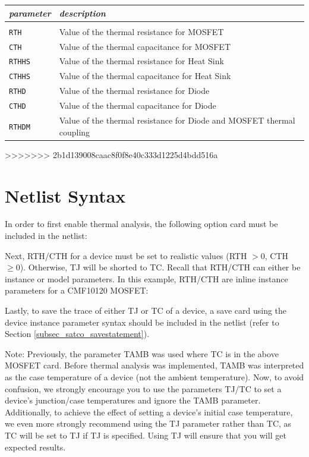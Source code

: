 \begin{tabular}{l l}
\textit{parameter} & \textit{description} \\ \hline \\ \vspace{-0.8\parskip}
\texttt{RTH} & Value of the thermal resistance for MOSFET \\
\texttt{CTH} & Value of the thermal capacitance for MOSFET \\
\texttt{RTHHS} & Value of the thermal resistance for Heat Sink \\
\texttt{CTHHS} & Value of the thermal capacitance for Heat Sink \\
\texttt{RTHD} & Value of the thermal resistance for Diode \\
\texttt{CTHD} & Value of the thermal capacitance for Diode \\
\texttt{RTHDM} & Value of the thermal resistance for Diode and MOSFET thermal coupling \\
\end{tabular}
>>>>>>> 2b1d139008caac8f0f8e40c333d1225d4bdd516a

\section{Netlist Syntax}
\label{subsec_sceadm_thermalnetsyntax}

In order to first enable thermal analysis, the following option card must be included in the netlist:


Next, RTH/CTH for a device must be set to realistic values (RTH $> 0$, CTH $\geq 0$). Otherwise, TJ will be shorted to TC. Recall that RTH/CTH can either be instance or model parameters. In this example, RTH/CTH are inline instance parameters for a CMF10120 MOSFET:


Lastly, to save the trace of either TJ or TC of a device, a save card using the device instance parameter syntax should be included in the netlist (refer to Section \ref{subsec_satco_savestatement}).


Note: Previously, the parameter TAMB was used where TC is in the above MOSFET card. Before thermal analysis was implemented, TAMB was interpreted as the case temperature of a device (not the ambient temperature). Now, to avoid confusion, we strongly encourage you to use the parameters TJ/TC to set a device's junction/case temperatures and ignore the TAMB parameter. Additionally, to achieve the effect of setting a device's initial case temperature, we even more strongly recommend using the TJ parameter rather than TC, as TC will be set to TJ if TJ is specified. Using TJ will ensure that you will get expected results.
	
